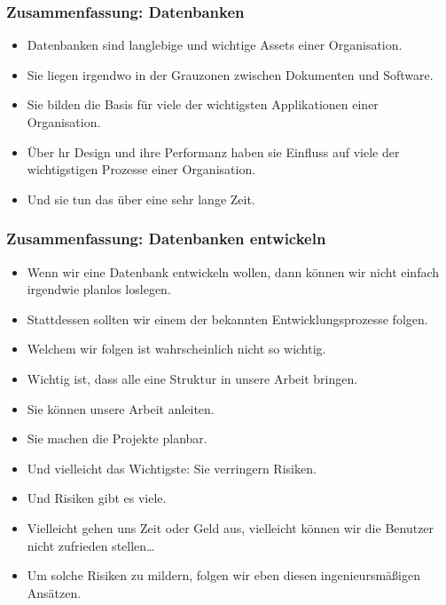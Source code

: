 \documentclass[aspectratio=169,mathserif,notheorems]{beamer}%
\begin{document}
%
\begin{frame}%
\frametitle{Zusammenfassung: Datenbanken}%
\begin{itemize}%
\item Datenbanken sind langlebige und wichtige Assets einer Organisation.%
%
\item<2-> Sie liegen irgendwo in der Grauzonen zwischen Dokumenten und Software.%
%
\item<3-> Sie bilden die Basis für viele der wichtigsten Applikationen einer Organisation.%
%
\item<4-> Über hr Design und ihre Performanz haben sie Einfluss auf viele der wichtigstigen Prozesse einer Organisation.%
%
\item<5-> Und sie tun das über eine sehr lange Zeit.%
\end{itemize}%
\end{frame}%
%
\begin{frame}%
\frametitle{Zusammenfassung: Datenbanken entwickeln}%
%
\begin{itemize}%
\item Wenn wir eine Datenbank entwickeln wollen, dann können wir nicht einfach irgendwie planlos loslegen.%
%
\item<2-> Stattdessen sollten wir einem der bekannten Entwicklungsprozesse folgen.%
%
\item<3-> Welchem wir folgen ist wahrscheinlich nicht so wichtig.%
%
\item<4-> Wichtig ist, dass alle eine Struktur in unsere Arbeit bringen.%
%
\item<5-> Sie können unsere Arbeit anleiten.%
%
\item<6-> Sie machen die Projekte planbar.%
%
\item<7-> Und vielleicht das Wichtigste: Sie verringern Risiken.%
%
\item<8-> Und Risiken gibt es viele.%
%
\item<9-> Vielleicht gehen uns Zeit oder Geld aus, vielleicht können wir die Benutzer nicht zufrieden stellen\dots%
%
\item<10-> Um solche Risiken zu mildern, folgen wir eben diesen ingenieursmäßigen Ansätzen.%
\end{itemize}%
\end{frame}%
%
\end{document}
